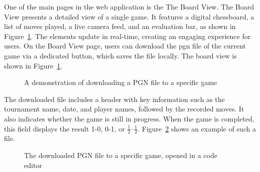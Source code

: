 One of the main pages in the web application is the The Board View. The Board View presents a detailed view of a single game. It features a digital chessboard, a list of moves played, a live camera feed, and an evaluation bar, as shown in Figure~\ref{fig:download-pgn}. The elements update in real-time, creating an engaging experience for users. On the Board View page, users can download the \gls{pgn} file of the current game via a dedicated button, which saves the file locally. The board view is shown in Figure~\ref{fig:download-pgn}. \\

\begin{figure}[h!] \centering {}\caption[Preview of downloading a PGN file]{A demonstration of downloading a PGN file to a specific game}\label{fig:download-pgn} \end{figure}

The downloaded file includes a header with key information such as the tournament name, date, and player names, followed by the recorded moves. It also indicates whether the game is still in progress. When the game is completed, this field displays the result 1-0, 0-1, or $\frac{1}{2}$–$\frac{1}{2}$. Figure~\ref{fig:downloaded-pgn} shows an example of such a file. \\

\newpage

\begin{figure}[h!] \centering {}\caption[The downloaded PGN file]{The downloaded PGN file to a specific game, opened in a code editor}\label{fig:downloaded-pgn} \end{figure}

